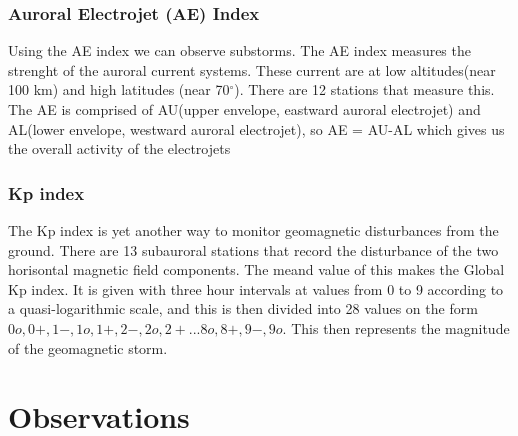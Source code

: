 \documentclass[norsk,a4paper,11pt]{article}
\begin{document}
\begin{multicols}{2}
\subsubsection{Auroral Electrojet (AE) Index} %
\label{sub:AE_index}
Using the AE index we can observe substorms. The AE index measures the strenght of the auroral current systems. These current are at low altitudes(near 100 km) and high latitudes (near 70$^\circ$). There are 12 stations that measure this. The AE is comprised of AU(upper envelope, eastward auroral electrojet) and AL(lower envelope, westward auroral electrojet), so AE = AU-AL which gives us the overall activity of the electrojets

\subsubsection{Kp index} %
\label{sub:Kp_index}
The Kp index is yet another way to monitor geomagnetic disturbances from the ground. There are 13 subauroral stations that record the disturbance of the two horisontal magnetic field components. The meand value of this makes the Global Kp index. It is given with three hour intervals at values from 0 to 9 according to a quasi-logarithmic scale, and this is then divided into 28 values on the form $0o,0+,1-,1o,1+,2-,2o,2+...8o,8+,9-,9o$. This then represents the magnitude of the geomagnetic storm.






\section{Observations} %
\label{sec:observations}


\end{multicols}
\end{document}
